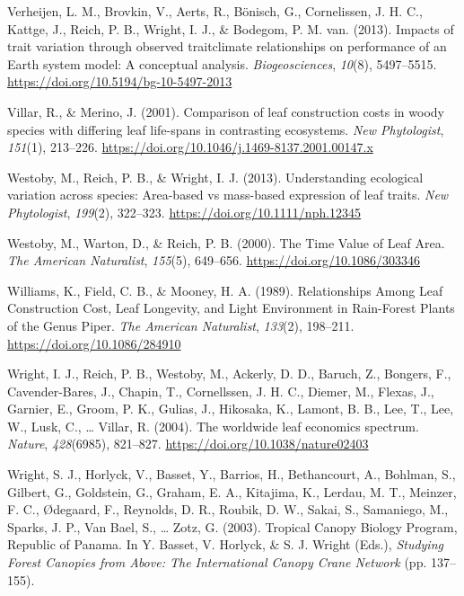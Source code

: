 \documentclass[
  12pt,
  letterpaper,
  DIV=11,
  numbers=noendperiod]{scrartcl}
\newlength{\cslhangindent}
\newlength{\cslentryspacingunit} %
\newenvironment{CSLReferences}[2] %
 {%
  \setlength{\parindent}{0pt}
  \ifodd #1
  \let\oldpar\par
  \def\par{\hangindent=\cslhangindent\oldpar}
  \fi
  \setlength{\parskip}{#2\cslentryspacingunit}
 }%
 {}
\begin{document}
\begin{CSLReferences}{1}{0}
\leavevmode{}%
Verheijen, L. M., Brovkin, V., Aerts, R., Bönisch, G., Cornelissen, J.
H. C., Kattge, J., Reich, P. B., Wright, I. J., \& Bodegom, P. M. van.
(2013). Impacts of trait variation through observed
trait\textendash climate relationships on performance of an {Earth}
system model: A conceptual analysis. \emph{Biogeosciences},
\emph{10}(8), 5497--5515. \url{https://doi.org/10.5194/bg-10-5497-2013}

\leavevmode{}%
Villar, R., \& Merino, J. (2001). Comparison of leaf construction costs
in woody species with differing leaf life-spans in contrasting
ecosystems. \emph{New Phytologist}, \emph{151}(1), 213--226.
\url{https://doi.org/10.1046/j.1469-8137.2001.00147.x}

\leavevmode{}%
Westoby, M., Reich, P. B., \& Wright, I. J. (2013). Understanding
ecological variation across species: {Area-based} vs mass-based
expression of leaf traits. \emph{New Phytologist}, \emph{199}(2),
322--323. \url{https://doi.org/10.1111/nph.12345}

\leavevmode{}%
Westoby, M., Warton, D., \& Reich, P. B. (2000). The {Time Value} of
{Leaf Area}. \emph{The American Naturalist}, \emph{155}(5), 649--656.
\url{https://doi.org/10.1086/303346}

\leavevmode{}%
Williams, K., Field, C. B., \& Mooney, H. A. (1989). Relationships
{Among Leaf Construction Cost}, {Leaf Longevity}, and {Light
Environment} in {Rain-Forest Plants} of the {Genus Piper}. \emph{The
American Naturalist}, \emph{133}(2), 198--211.
\url{https://doi.org/10.1086/284910}

\leavevmode{}%
Wright, I. J., Reich, P. B., Westoby, M., Ackerly, D. D., Baruch, Z.,
Bongers, F., Cavender-Bares, J., Chapin, T., Cornellssen, J. H. C.,
Diemer, M., Flexas, J., Garnier, E., Groom, P. K., Gulias, J., Hikosaka,
K., Lamont, B. B., Lee, T., Lee, W., Lusk, C., \ldots{} Villar, R.
(2004). The worldwide leaf economics spectrum. \emph{Nature},
\emph{428}(6985), 821--827. \url{https://doi.org/10.1038/nature02403}

\leavevmode{}%
Wright, S. J., Horlyck, V., Basset, Y., Barrios, H., Bethancourt, A.,
Bohlman, S., Gilbert, G., Goldstein, G., Graham, E. A., Kitajima, K.,
Lerdau, M. T., Meinzer, F. C., Ødegaard, F., Reynolds, D. R., Roubik, D.
W., Sakai, S., Samaniego, M., Sparks, J. P., Van Bael, S., \ldots{}
Zotz, G. (2003). Tropical {Canopy Biology Program}, {Republic} of
{Panama}. In Y. Basset, V. Horlyck, \& S. J. Wright (Eds.),
\emph{Studying {Forest Canopies} from {Above}: {The International Canopy
Crane Network}} (pp. 137--155).


\end{CSLReferences}
\end{document}

